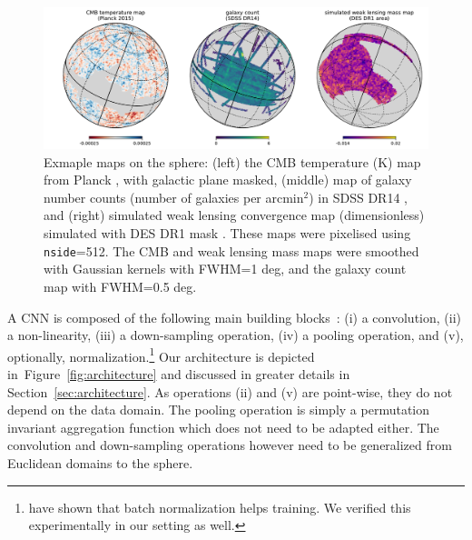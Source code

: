 \documentclass[final,twocolumn,3p,times,authoryear]{elsarticle}
\newcommand{\figref}[1]{Figure~\ref{fig:#1}}
\newcommand{\secref}[1]{Section~\ref{sec:#1}}
\newcommand{\1}{\b{1}}              %
\newcommand{\0}{\b{0}}              %
\begin{document}
\begin{figure}
\includegraphics[width=\linewidth]{figures/figure_example_maps.pdf}
\caption{Exmaple maps on the sphere:
(left) the CMB temperature (K) map from Planck \citep{planck2015overview}, with galactic plane masked,
(middle) map of galaxy number counts (number of galaxies per arcmin$^2$) in SDSS DR14 \citep{abolfathi2017sdssDR14},
and (right) simulated weak lensing convergence map (dimensionless) simulated with DES DR1 mask \citep{des2018dr1}.
These maps were pixelised using \texttt{nside}=512.
The CMB and weak lensing mass maps were smoothed with Gaussian kernels with FWHM=1 deg, and the galaxy count map with FWHM=0.5 deg.
}
\label{fig:example_maps}
\end{figure}

A CNN is composed of the following main building blocks~\citep{lecun1998cnn}:
(i) a convolution,
(ii) a non-linearity,
(iii) a down-sampling operation,
(iv) a pooling operation, and
(v), optionally,  normalization.\footnote{\citet{ioffe2015batchnorm} have shown that batch normalization helps training. We verified this experimentally in our setting as well.}
Our architecture is depicted in~\figref{architecture} and discussed in greater details in \secref{architecture}. As operations (ii) and (v) are point-wise, they do not depend on the data domain. The pooling operation is simply a permutation invariant aggregation function which does not need to be adapted either. The convolution and down-sampling operations however need to be generalized from Euclidean domains to the sphere.
\end{document}
